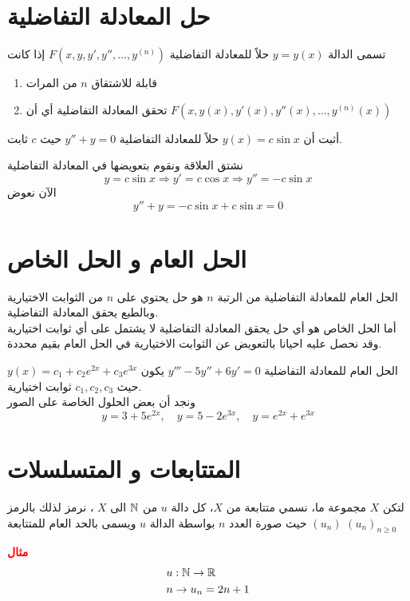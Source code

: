 \section[حل المعادلة التفاضلية]{حل المعادلة التفاضلية \cite{diff_eqs_pt1}}
تسمى الدالة $y=y(x)$ حلاً للمعادلة التفاضلية $F(x,y,y',y'',\dots,y^{(n)})$ إذا كانت
\begin{enumerate}
    \item قابلة للاشتقاق $n$ من المرات
    \item تحقق المعادلة التفاضلية أي أن $F(x,y(x),y'(x),y''(x),\dots,y^{(n)}(x))$
\end{enumerate}
\begin{example}
    أثبت أن $y(x)=c \sin x$ حلاً للمعادلة التفاضلية $y''+y=0$ حيث $c$ ثابت.
\end{example}
\begin{solution}
    نشتق العلاقة ونقوم بتعويضها في المعادلة التفاضلية
\[
y=c\sin x\Rightarrow y'=c\cos x\Rightarrow y''=-c\sin x
\]
الآن نعوض
\[
y''+y=-c\sin x+c\sin x=0
\]
\end{solution}
\section[الحل العام و الحل الخاص]{الحل العام و الحل الخاص \cite{diff_eqs_pt1}}
الحل العام للمعادلة التفاضلية من الرتبة $n$ هو حل يحتوي على $n$ من الثوابت الاختيارية وبالطبع يحقق المعادلة التفاضلية.\\
أما الحل الخاص هو أي حل يحقق المعادلة التفاضلية لا يشتمل على أي ثوابت اختيارية وقد نحصل عليه احيانا بالتعويض عن الثوابت الاختيارية في الحل العام بقيم محددة.

\begin{example}
    الحل العام للمعادلة التفاضلية $y'''-5y''+6y'=0$ يكون $y(x)=c_1+c_2e^{2x}+c_3e^{3x}$ حيث $c_1,c_2,c_3$ ثوابت اختيارية.\\
    ونجد أن بعض الحلول الخاصة على الصور 
    \[
    y=3+5e^{2x},\quad y=5-2e^{3x},\quad y=e^{2x}+e^{3x}
    \]
\end{example}

\section[المتتابعات و المتسلسلات]{المتتابعات و المتسلسلات \cite{mathanal}}

\begin{definition}
	لتكن $X$ مجموعة ما، نسمي متتابعة من $X$، كل دالة $u$ من $\mathbb{N}$ الى $X$ ، نرمز لذلك بالرمز $(u_n)$ حيث صورة العدد $n$ بواسطة الدالة $u$ ويسمى بالحد العام للمتتابعة $(u_n)_{n\geq 0}$
\end{definition}
\noindent
\textbf{\textcolor{red}{مثال}}
\begin{align*}
&u : \mathbb{N} \to \mathbb{R}\\
&n \to u_n = 2n+1
\end{align*}

